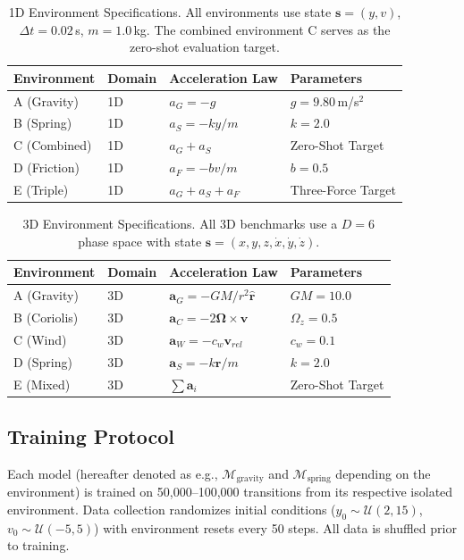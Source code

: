 \documentclass[twoside,11pt]{article}
\begin{document}
\begin{table}[h]
\centering
\caption{1D Environment Specifications. All environments use state $\mathbf{s} = (y, v)$, $\Delta t = 0.02$\,s, $m = 1.0$\,kg. The combined environment C serves as the zero-shot evaluation target.}
\label{tab:envs_1d}
\begin{tabular}{@{}llll@{}}
\toprule
Environment & Domain & Acceleration Law & Parameters \\
\midrule
A (Gravity)  & 1D & $a_G = -g$ & $g=9.80$\,m/s$^2$ \\
B (Spring)   & 1D & $a_S = -ky/m$ & $k=2.0$ \\
C (Combined) & 1D & $a_G + a_S$ & Zero-Shot Target \\
D (Friction) & 1D & $a_F = -bv/m$ & $b=0.5$ \\
E (Triple)   & 1D & $a_G + a_S + a_F$ & Three-Force Target \\
\bottomrule
\end{tabular}
\end{table}

\begin{table}[h]
\centering
\caption{3D Environment Specifications. All 3D benchmarks use a $D=6$ phase space with state $\mathbf{s} = (x,y,z, \dot{x},\dot{y},\dot{z})$.}
\label{tab:envs}
\begin{tabular}{@{}llll@{}}
\toprule
Environment & Domain & Acceleration Law & Parameters \\
\midrule
A (Gravity) & 3D & $\mathbf{a}_G = -GM/r^2 \mathbf{\hat{r}}$ & $GM=10.0$ \\
B (Coriolis) & 3D & $\mathbf{a}_C = -2\boldsymbol{\Omega} \times \mathbf{v}$ & $\Omega_z=0.5$ \\
C (Wind) & 3D & $\mathbf{a}_W = -c_w \mathbf{v}_{rel}$ & $c_w=0.1$ \\
D (Spring) & 3D & $\mathbf{a}_S = -k\mathbf{r}/m$ & $k=2.0$ \\
E (Mixed) & 3D & $\sum \mathbf{a}_i$ & Zero-Shot Target \\
\bottomrule
\end{tabular}
\end{table}

\subsection{Training Protocol}

Each model (hereafter denoted as e.g., $\mathcal{M}_{\text{gravity}}$ and $\mathcal{M}_{\text{spring}}$ depending on the environment) is trained on 50{,}000--100{,}000 transitions from its respective isolated environment. Data collection randomizes initial conditions ($y_0 \sim \mathcal{U}(2, 15)$, $v_0 \sim \mathcal{U}(-5,5)$) with environment resets every 50 steps. All data is shuffled prior to training.
\end{document}
